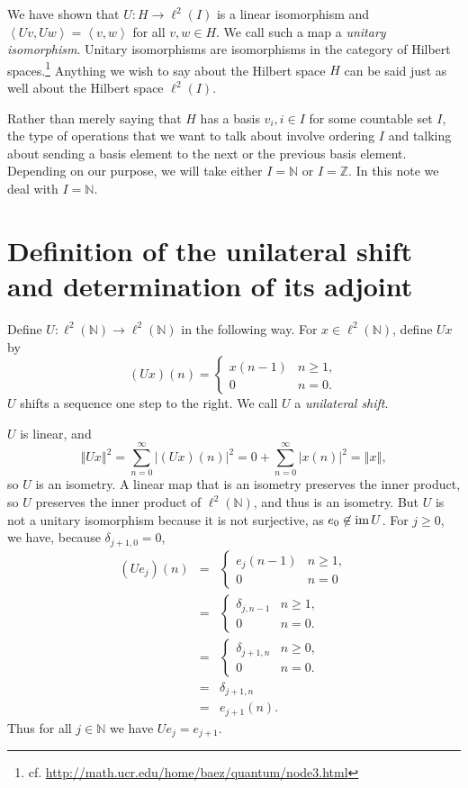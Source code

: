\documentclass{article}
\newcommand{\inner}[2]{\left\langle #1, #2 \right\rangle}
\newcommand{\im}{\textrm{im\,}}
\newcommand{\norm}[1]{\left\Vert #1 \right\Vert}
\begin{document}
We have shown that $U:H \to \ell^2(I)$ is a linear isomorphism and $\inner{Uv}{Uw}=\inner{v}{w}$ for all $v,w \in H$. 
We call such a map a {\em unitary isomorphism}.
Unitary isomorphisms are isomorphisms in the category of Hilbert spaces.\footnote{cf. \url{http://math.ucr.edu/home/baez/quantum/node3.html}} Anything we wish to say about the Hilbert space $H$ can be said just as well about the Hilbert
space $\ell^2(I)$.

Rather than merely saying that $H$ has a basis $v_i,i\in I$ for some countable set $I$, the type of operations that we want to talk about involve ordering $I$ and talking about
sending a basis element to the next or the previous basis element.
Depending on our purpose, we will take either $I=\mathbb{N}$ or $I=\mathbb{Z}$. In this note we deal with $I=\mathbb{N}$.

\section{Definition  of the unilateral shift and determination of its adjoint}
Define $U:\ell^2(\mathbb{N}) \to \ell^2(\mathbb{N})$ 
in the following way.
For $x \in \ell^2(\mathbb{N})$, define $Ux$ by
\[
(Ux)(n)=\begin{cases}
x(n-1)&n \geq 1,\\
0&n=0.
\end{cases}
\]
$U$ shifts a sequence one step to the right. We call $U$ a {\em unilateral shift}. 

$U$ is linear, and
\[
\norm{Ux}^2=\sum_{n=0}^\infty |(Ux)(n)|^2 = 0 + \sum_{n=0}^\infty |x(n)|^2 = \norm{x},
\]
so $U$ is an isometry. A linear map that is an isometry preserves the inner product, so $U$ preserves the inner product of $\ell^2(\mathbb{N})$, and thus is an isometry.
But $U$ is not a unitary isomorphism because it is not surjective, as $e_0 \not \in
\im U$. 
For $j \geq 0$, we have, because $\delta_{j+1,0}=0$,
\begin{eqnarray*}
(Ue_j)(n)&=&
\begin{cases}
e_j(n-1)&n \geq 1,\\
0&n=0
\end{cases}\\
&
=&\begin{cases}
\delta_{j,n-1}&n \geq 1,\\
0&n=0.
\end{cases}\\
&=&\begin{cases}
\delta_{j+1,n}&n \geq 0,\\
0&n=0.
\end{cases}\\
&=&\delta_{j+1,n}\\
&=&e_{j+1}(n).
\end{eqnarray*}
Thus for all $j \in \mathbb{N}$ we have $Ue_j=e_{j+1}$.
\end{document}
